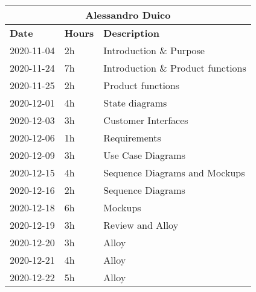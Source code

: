 \begin{table}[H]
    \centering
    \begin{tabular}{|l|l|l|}
        \multicolumn{3}{c}{\textbf{Alessandro Duico}}                      \\
        \hline
        \textbf{Date} & \textbf{Hours} & \textbf{Description}              \\\hline
        2020-11-04    & 2h             & Introduction \& Purpose           \\\hline
        2020-11-24    & 7h             & Introduction \& Product functions \\\hline
        2020-11-25    & 2h             & Product functions                 \\\hline
        2020-12-01    & 4h             & State diagrams                    \\\hline
        2020-12-03    & 3h             & Customer Interfaces               \\\hline
        2020-12-06    & 1h             & Requirements                      \\\hline
        2020-12-09    & 3h             & Use Case Diagrams                 \\\hline
        2020-12-15    & 4h             & Sequence Diagrams and Mockups     \\\hline
        2020-12-16    & 2h             & Sequence Diagrams                 \\\hline
        2020-12-18    & 6h             & Mockups                           \\\hline
        2020-12-19    & 3h             & Review and Alloy                  \\\hline
        2020-12-20    & 3h             & Alloy                             \\\hline
        2020-12-21    & 4h             & Alloy                             \\\hline 
        2020-12-22    & 5h             & Alloy                             \\\hline 
    \end{tabular}
\end{table}